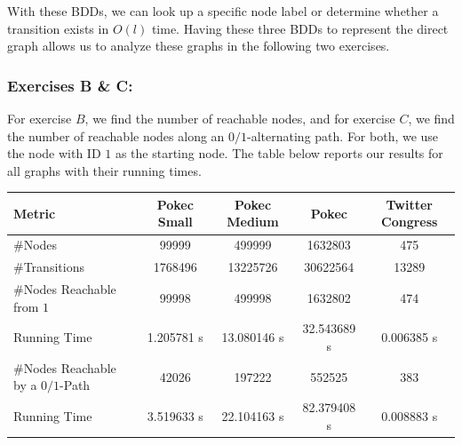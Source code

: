             With these BDDs, we can look up a specific node label or determine
            whether a transition exists in $O(l)$ time. Having these three BDDs
            to represent the direct graph allows us to analyze these graphs in
            the following two exercises.

        \subsubsection{Exercises B \& C:}

            For exercise $B$, we find the number of reachable nodes, and for
            exercise $C$, we find the number of reachable nodes along an
            $0/1$-alternating path. For both, we use the node with ID $1$ as
            the starting node. The table below reports our results for all
            graphs with their running times.

            \begin{table}[h]
                \centering
                \vspace{0.25cm}
                \begin{tabular}{l c c c c}
                    \toprule
                    \textbf{Metric} & \textbf{Pokec Small} &
                    \textbf{Pokec Medium} & \textbf{Pokec} &
                    \textbf{Twitter Congress} \\
                    \midrule
                    \#Nodes & 
                    99999 & 499999 & 1632803 & 475 \\
                    \#Transitions & 
                    1768496 & 13225726 & 30622564 & 13289 \\
                    \#Nodes Reachable from $1$ & 
                    99998 & 499998 & 1632802 & 474 \\
                    Running Time &
                    1.205781 s & 13.080146 s & 32.543689 s & 0.006385 s \\
                    \addlinespace
                    \#Nodes Reachable by a $0/1$-Path &
                    42026 & 197222 & 552525 & 383 \\
                    Running Time & 
                    3.519633 s & 22.104163 s & 82.379408 s & 0.008883 s \\
                    \bottomrule
                \end{tabular}
            \end{table}
